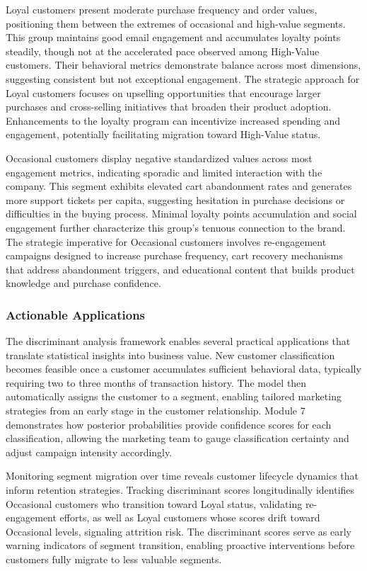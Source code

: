 \documentclass[
]{article}
\begin{document}
Loyal customers present moderate purchase frequency and order values,
positioning them between the extremes of occasional and high-value
segments. This group maintains good email engagement and accumulates
loyalty points steadily, though not at the accelerated pace observed
among High-Value customers. Their behavioral metrics demonstrate balance
across most dimensions, suggesting consistent but not exceptional
engagement. The strategic approach for Loyal customers focuses on
upselling opportunities that encourage larger purchases and
cross-selling initiatives that broaden their product adoption.
Enhancements to the loyalty program can incentivize increased spending
and engagement, potentially facilitating migration toward High-Value
status.

Occasional customers display negative standardized values across most
engagement metrics, indicating sporadic and limited interaction with the
company. This segment exhibits elevated cart abandonment rates and
generates more support tickets per capita, suggesting hesitation in
purchase decisions or difficulties in the buying process. Minimal
loyalty points accumulation and social engagement further characterize
this group's tenuous connection to the brand. The strategic imperative
for Occasional customers involves re-engagement campaigns designed to
increase purchase frequency, cart recovery mechanisms that address
abandonment triggers, and educational content that builds product
knowledge and purchase confidence.

\subsubsection{Actionable Applications}

The discriminant analysis framework enables several practical
applications that translate statistical insights into business value.
New customer classification becomes feasible once a customer accumulates
sufficient behavioral data, typically requiring two to three months of
transaction history. The model then automatically assigns the customer
to a segment, enabling tailored marketing strategies from an early stage
in the customer relationship. Module 7 demonstrates how posterior
probabilities provide confidence scores for each classification,
allowing the marketing team to gauge classification certainty and adjust
campaign intensity accordingly.

Monitoring segment migration over time reveals customer lifecycle
dynamics that inform retention strategies. Tracking discriminant scores
longitudinally identifies Occasional customers who transition toward
Loyal status, validating re-engagement efforts, as well as Loyal
customers whose scores drift toward Occasional levels, signaling
attrition risk. The discriminant scores serve as early warning
indicators of segment transition, enabling proactive interventions
before customers fully migrate to less valuable segments.
\end{document}
